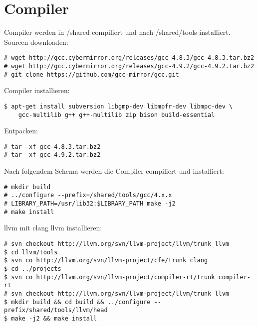 \chapter{Compiler}
Compiler werden in /shared compiliert und nach /shared/tools installiert.
Sourcen downloaden:
\begin{lstlisting}[style=Bash]
# wget http://gcc.cybermirror.org/releases/gcc-4.8.3/gcc-4.8.3.tar.bz2
# wget http://gcc.cybermirror.org/releases/gcc-4.9.2/gcc-4.9.2.tar.bz2
# git clone https://github.com/gcc-mirror/gcc.git
\end{lstlisting}
Compiler installieren:
\begin{lstlisting}[style=Bash]
$ apt-get install subversion libgmp-dev libmpfr-dev libmpc-dev \
	gcc-multilib g++ g++-multilib zip bison build-essential
\end{lstlisting}
Entpacken:
\begin{lstlisting}[style=Bash]
# tar -xf gcc-4.8.3.tar.bz2
# tar -xf gcc-4.9.2.tar.bz2
\end{lstlisting}
Nach folgendem Schema werden die Compiler compiliert und installiert:
\begin{lstlisting}[style=Bash]
# mkdir build 
# ../configure --prefix=/shared/tools/gcc/4.x.x
# LIBRARY_PATH=/usr/lib32:$LIBRARY_PATH make -j2
# make install
\end{lstlisting}
llvm mit clang llvm installieren:
\begin{lstlisting}[style=Bash]
# svn checkout http://llvm.org/svn/llvm-project/llvm/trunk llvm
$ cd llvm/tools
$ svn co http://llvm.org/svn/llvm-project/cfe/trunk clang
$ cd ../projects
$ svn co http://llvm.org/svn/llvm-project/compiler-rt/trunk compiler-rt
# svn checkout http://llvm.org/svn/llvm-project/llvm/trunk llvm
$ mkdir build && cd build && ../configure --prefix/shared/tools/llvm/head
$ make -j2 && make install
\end{lstlisting}
